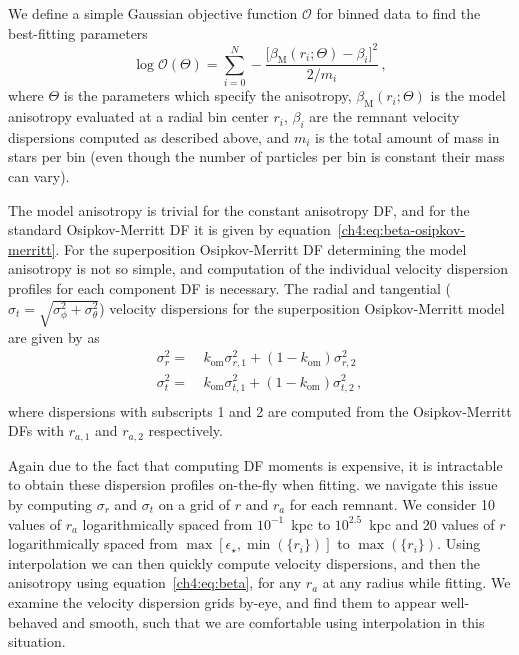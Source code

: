 We define a simple Gaussian objective function $\mathcal{O}$ for binned data to find the best-fitting parameters
\begin{equation}
    \label{ch4:eq:beta-objective-function}
    \log \mathcal{O}(\Theta) = \sum_{i=0}^{N} -\frac{ \big[ \beta_\mathrm{M}(r_{i};\Theta) - \beta_{i} \big]^{2} }{2/m_{i}}\,,
\end{equation}
\noindent where $\Theta$ is the parameters which specify the anisotropy, $\beta_\mathrm{M}(r_{i};\Theta)$ is the model anisotropy evaluated at a radial bin center $r_{i}$, $\beta_{i}$ are the remnant velocity dispersions computed as described above, and $m_{i}$ is the total amount of mass in stars per bin (even though the number of particles per bin is constant their mass can vary). 

The model anisotropy is trivial for the constant anisotropy DF, and for the standard Osipkov-Merritt DF it is given by equation~\eqref{ch4:eq:beta-osipkov-merritt}. For the superposition Osipkov-Merritt DF determining the model anisotropy is not so simple, and computation of the individual velocity dispersion profiles for each component DF is necessary. The radial and tangential ($\sigma_{t} = \sqrt{\sigma_{\phi}^{2} + \sigma_{\theta}^{2}}$) velocity dispersions for the superposition Osipkov-Merritt model are given by \textcite{merritt85} as
\begin{equation}
\label{ch4:eq:superposition-osipkov-merritt-dispersions}
\begin{split}
    \sigma_{r}^{2} = &\ k_\mathrm{om} \sigma_{r,1}^{2} + (1-k_{\mathrm{om}}) \sigma_{r,2}^{2} \\      
    \sigma_{t}^{2} = &\ k_\mathrm{om} \sigma_{t,1}^{2} + (1-k_{\mathrm{om}}) \sigma_{t,2}^{2}\,, \\      
\end{split}
\end{equation}
where dispersions with subscripts 1 and 2 are computed from the Osipkov-Merritt DFs with $r_{a,1}$ and $r_{a,2}$ respectively.

Again due to the fact that computing DF moments is expensive, it is intractable to obtain these dispersion profiles on-the-fly when fitting. we navigate this issue by computing $\sigma_{r}$ and $\sigma_{t}$ on a grid of $r$ and $r_{a}$ for each remnant. We consider 10 values of $r_{a}$ logarithmically spaced from $10^{-1}$~kpc to $10^{2.5}$~kpc and 20 values of $r$ logarithmically spaced from $\max[\epsilon_{\star},\min(\{ r_{i} \})]$ to $\max(\{ r_{i} \})$. Using interpolation we can then quickly compute velocity dispersions, and then the anisotropy using equation~\eqref{ch4:eq:beta}, for any $r_{a}$ at any radius while fitting. We examine the velocity dispersion grids by-eye, and find them to appear well-behaved and smooth, such that we are comfortable using interpolation in this situation.

